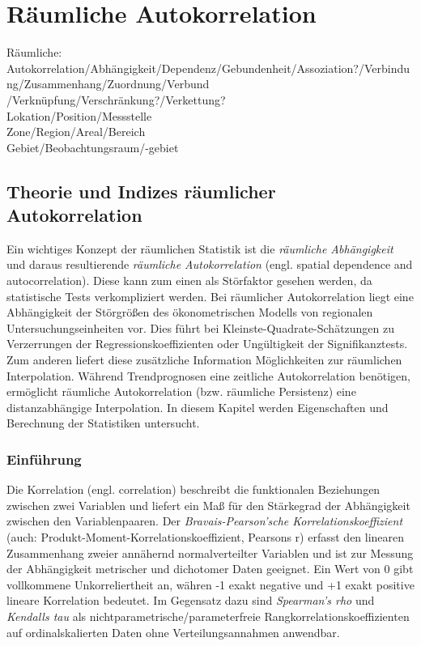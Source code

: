\chapter{Räumliche Autokorrelation}
\label{ch:autocorrelation}

Räumliche: Autokorrelation/Abhängigkeit/Dependenz/Gebundenheit/Assoziation?/Verbindung/Zusammenhang/Zuordnung/Verbund
/Verknüpfung/Verschränkung?/Verkettung? \\

Lokation/Position/Messstelle\\

Zone/Region/Areal/Bereich\\

Gebiet/Beobachtungsraum/-gebiet

\section{Theorie und Indizes räumlicher Autokorrelation}

Ein wichtiges Konzept der räumlichen Statistik ist die \emph{räumliche Abhängigkeit} und daraus 
resultierende \emph{räumliche Autokorrelation} (engl. spatial dependence and autocorrelation).
Diese kann zum einen als Störfaktor gesehen werden, da statistische Tests verkompliziert werden. 
Bei räumlicher Autokorrelation liegt eine Abhängigkeit der Störgrößen des ökonometrischen Modells von regionalen 
Untersuchungseinheiten vor. Dies führt bei Kleinste-Quadrate-Schätzungen zu Verzerrungen der Regressionskoeffizienten 
oder Ungültigkeit der Signifikanztests. Zum anderen liefert diese zusätzliche Information Möglichkeiten 
zur räumlichen Interpolation. Während Trendprognosen eine zeitliche Autokorrelation benötigen, 
ermöglicht räumliche Autokorrelation (bzw. räumliche Persistenz) eine distanzabhängige Interpolation. 
In diesem Kapitel werden Eigenschaften und Berechnung der Statistiken untersucht.

\subsection{Einführung}

Die Korrelation (engl. correlation) beschreibt die funktionalen Beziehungen zwischen zwei 
Variablen und liefert ein Maß für den Stärkegrad der Abhängigkeit zwischen den Variablenpaaren. 
Der \emph{Bravais-Pearson'sche Korrelationskoeffizient} (auch: Produkt-Moment-Korrelationskoeffizient, Pearsons r) 
erfasst den linearen Zusammenhang zweier annähernd normalverteilter Variablen und ist zur Messung der Abhängigkeit 
metrischer und dichotomer Daten geeignet. Ein Wert von 0 gibt vollkommene Unkorreliertheit an, währen -1 exakt 
negative und +1 exakt positive lineare Korrelation bedeutet. Im Gegensatz dazu sind \emph{Spearman's rho} und 
\emph{Kendalls tau} als nichtparametrische/parameterfreie Rangkorrelationskoeffizienten auf ordinalskalierten Daten 
ohne Verteilungsannahmen anwendbar.

